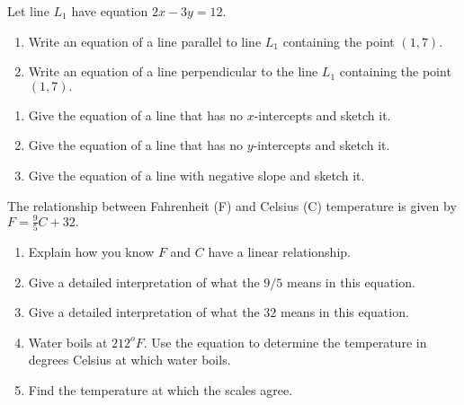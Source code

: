 \documentclass[11pt]{article}
\begin{document}
{} Let line $L_1$ have equation $2x-3y=12.$
\begin{enumerate}
\item Write an equation of a line parallel to line $L_1$ containing the point $(1,7).$
\vfill
\item Write an equation of a line perpendicular to the line $L_1$ containing the point $(1,7).$
\vfill
\end{enumerate}


\newpage

{}

\begin{enumerate}

\item Give the equation of a line that has no $x$-intercepts and sketch it.

\vfill
\item Give the equation of a line that has no $y$-intercepts and sketch it.

\vfill

\item Give the equation of a line with negative slope and sketch it.

\vfill

\end{enumerate}

{} The relationship between Fahrenheit (F) and Celsius (C) temperature is given by $F=\frac{9}{5}C+32.$
\begin{enumerate}
\item Explain how you know $F$ and $C$ have a linear relationship.
\item Give a detailed interpretation of what the $9/5$ means in this equation.
\item Give a detailed interpretation of what the $32$ means in this equation.
\item Water boils at $212^oF$. Use the equation to determine the temperature in degrees Celsius at which water boils.
\item Find the temperature at which the scales agree.
\end{enumerate}
\end{document}
